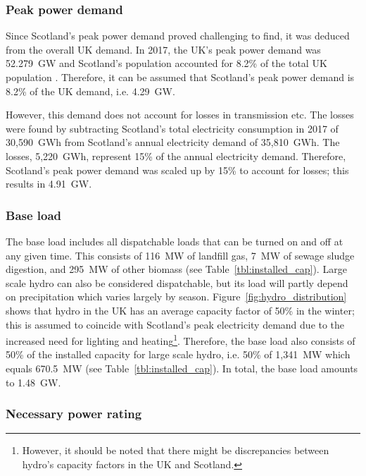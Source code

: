 \subsubsection{Peak power demand}

Since Scotland's peak power demand proved challenging to find, it was deduced from the overall UK demand.
In 2017, the UK's peak power demand was 52.279~GW \citep{BEIS2018PeakDemand} and Scotland's population accounted for 8.2\% of the total UK population \citep{OfficeforNationalStatistics2018}.
Therefore, it can be assumed that Scotland's peak power demand is 8.2\% of the UK demand, i.e. 4.29~GW.

However, this demand does not account for losses in transmission etc.
The losses were found by subtracting Scotland's total electricity consumption in 2017 of 30,590~GWh \citep{BEIS2018ElecUK} from Scotland's annual electricity demand of 35,810~GWh.
The losses, 5,220~GWh, represent 15\% of the annual electricity demand.
Therefore, Scotland's peak power demand was scaled up by 15\% to account for losses; this results in 4.91~GW.



\subsubsection{Base load}

The base load includes all dispatchable loads that can be turned on and off at any given time.
This consists of 116~MW of landfill gas, 7~MW of sewage sludge digestion, and 295~MW of other biomass (see Table~\ref{tbl:installed_cap}).
Large scale hydro can also be considered dispatchable, but its load will partly depend on precipitation which varies largely by season.
Figure~\ref{fig:hydro_distribution} shows that hydro in the UK has an average capacity factor of 50\% in the winter; this is assumed to coincide with Scotland's peak electricity demand due to the increased need for lighting and heating\footnote{However, it should be noted that there might be discrepancies between hydro's capacity factors in the UK and Scotland.}.
Therefore, the base load also consists of 50\% of the installed capacity for large scale hydro, i.e. 50\% of 1,341~MW which equals 670.5~MW (see Table~\ref{tbl:installed_cap}).
In total, the base load amounts to 1.48~GW.




\subsubsection{Necessary power rating}

